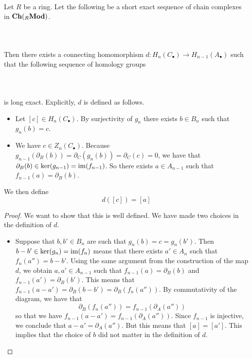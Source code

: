\documentclass[a4paper]{article}
\begin{document}
\begin{thm}{}{} Let $R$ be a ring. Let the following be a short exact sequence of chain complexes in $\bold{Ch}({_R\bold{Mod}})$. \\~\\
\\~\\
Then there exists a connecting homomorphism $d:H_n(C_\bullet)\to H_{n-1}(A_\bullet)$ such that the following sequence of homology groups \\~\\
\\~\\
is long exact. Explicitly, $d$ is defined as follows. 
\begin{itemize}
\item Let $[c]\in H_n(C_\bullet)$. By surjectivity of $g_n$ there exists $b\in B_n$ such that $g_n(b)=c$. 
\item We have $c\in Z_n(C_\bullet)$. Because $g_{n-1}(\partial_B(b))=\partial_C(g_n(b))=\partial_C(c)=0$, we have that $\partial_B(b)\in\ker(g_{n-1})=\operatorname{im}(f_{n-1})$. So there exists $a\in A_{n-1}$ such that $f_{n-1}(a)=\partial_B(b)$. 
\end{itemize} 
We then define $$d([c])=[a]$$ \tcbline
\begin{proof}
We want to show that this is well defined. We have made two choices in the definition of $d$. 
\begin{itemize}
\item Suppose that $b,b'\in B_n$ are such that $g_n(b)=c=g_n(b')$. Then $b-b'\in\ker(g_n)=\operatorname{im}(f_n)$ means that there exists $a'\in A_n$ such that $f_n(a'')=b-b'$. Using the same argument from the construction of the map $d$, we obtain $a,a'\in A_{n-1}$ such that $f_{n-1}(a)=\partial_B(b)$ and $f_{n-1}(a')=\partial_B(b')$. This means that $f_{n-1}(a-a')=\partial_B(b-b')=\partial_B(f_n(a''))$. By commutativity of the diagram, we have that $$\partial_B(f_n(a''))=f_{n-1}(\partial_A(a''))$$ so that we have $f_{n-1}(a-a')=f_{n-1}(\partial_A(a''))$. Since $f_{n-1}$ is injective, we conclude that $a-a'=\partial_A(a'')$. But this means that $[a]=[a']$. This implies that the choice of $b$ did not matter in the definition of $d$. 

\end{itemize}
\end{proof}
\end{thm}
\end{document}
